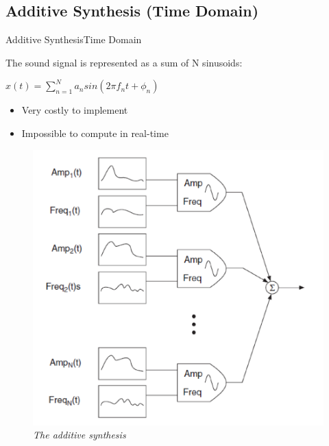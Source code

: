 \documentclass{bredelebeamer}
\begin{document}
\subsection{Additive Synthesis (Time Domain)}
\begin{frame}{Additive Synthesis}{Time Domain}
\begin{block}{}
The sound signal is represented as a sum of N sinusoids: \\
\centerline{
$ x(t) = \sum\limits_{n=1}^N a_{n} sin(2 \pi f_{n} t + \phi_{n})$}
\begin{itemize}
\item Very costly to implement
\item Impossible to compute in real-time
\end{itemize}
\end{block}
\begin{figure}
	\centerline
	{\includegraphics[scale=0.25]{additif.png}}
	\caption{\it The additive synthesis}
\end{figure}
\end{frame}

\end{document}
